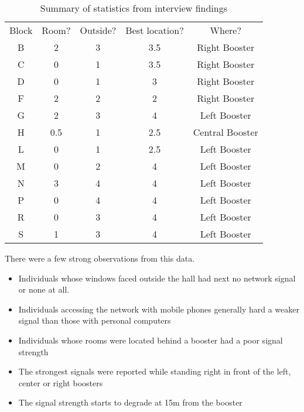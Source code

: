 \begin{table}
    \centering
    \begin{tabular}{|c|c|c|c|c|}
        Block & Room? & Outside? & Best location? & Where? \\
        B & 2 & 3 & 3.5 & Right Booster \\
        C & 0 & 1 & 3.5 & Right Booster \\ 
        D & 0 & 1 & 3 & Right Booster \\
        F & 2 & 2 & 2 & Right Booster \\
        G & 2 & 3 & 4 & Left Booster \\
        H & 0.5 & 1 & 2.5 & Central Booster \\
        L & 0 & 1 & 2.5 & Left Booster \\
        M & 0 & 2 & 4 & Left Booster \\
        N & 3 & 4 & 4 & Left Booster \\
        P & 0 & 4 & 4 & Left Booster \\
        R & 0 & 3 & 4 & Left Booster \\
        S & 1 & 3 & 4 & Left Booster \\
    \end{tabular}
    \caption{Summary of statistics from interview findings}
    \label{tab:my_label}
\end{table}

There were a few strong observations from this data.
\begin{itemize}
    \item Individuals whose windows faced outside the hall had next no network signal or none at all.
    \item Individuals accessing the network with mobile phones generally hard a weaker signal than those with personal computers
    \item Individuals whose rooms were located behind a booster had a poor signal strength
    \item The strongest signals were reported while standing right in front of the left, center or right boosters
    \item The signal strength starts to degrade at 15m from the booster
\end{itemize}